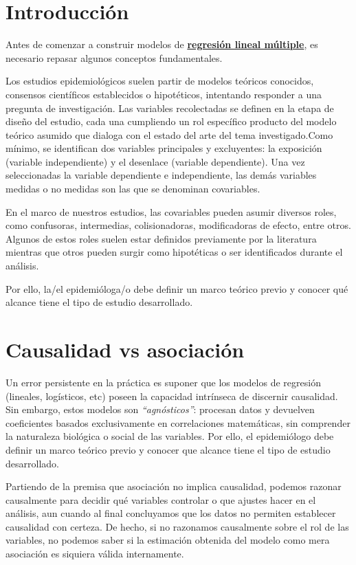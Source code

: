 \documentclass[
  spanish,
  a4paper,
]{scrbook}
\begin{document}
\section{Introducción}\label{introducciuxf3n-15}

Antes de comenzar a construir modelos de
\href{07_reg_lineal_multiple.qmd}{\textbf{regresión lineal múltiple}},
es necesario repasar algunos conceptos fundamentales.

Los estudios epidemiológicos suelen partir de modelos teóricos
conocidos, consensos científicos establecidos o hipotéticos, intentando
responder a una pregunta de investigación. Las variables recolectadas se
definen en la etapa de diseño del estudio, cada una cumpliendo un rol
específico producto del modelo teórico asumido que dialoga con el estado
del arte del tema investigado.Como mínimo, se identifican dos variables
principales y excluyentes: la exposición (variable independiente) y el
desenlace (variable dependiente). Una vez seleccionadas la variable
dependiente e independiente, las demás variables medidas o no medidas
son las que se denominan covariables.

En el marco de nuestros estudios, las covariables pueden asumir diversos
roles, como confusoras, intermedias, colisionadoras, modificadoras de
efecto, entre otros. Algunos de estos roles suelen estar definidos
previamente por la literatura mientras que otros pueden surgir como
hipotéticas o ser identificados durante el análisis.

Por ello, la/el epidemióloga/o debe definir un marco teórico previo y
conocer qué alcance tiene el tipo de estudio desarrollado.

\section{Causalidad vs asociación}\label{causalidad-vs-asociaciuxf3n}

Un error persistente en la práctica es suponer que los modelos de
regresión (lineales, logísticos, etc) poseen la capacidad intrínseca de
discernir causalidad. Sin embargo, estos modelos son
\emph{``agnósticos''}: procesan datos y devuelven coeficientes basados
exclusivamente en correlaciones matemáticas, sin comprender la
naturaleza biológica o social de las variables. Por ello, el
epidemiólogo debe definir un marco teórico previo y conocer que alcance
tiene el tipo de estudio desarrollado.

Partiendo de la premisa que asociación no implica causalidad, podemos
razonar causalmente para decidir qué variables controlar o que ajustes
hacer en el análisis, aun cuando al final concluyamos que los datos no
permiten establecer causalidad con certeza. De hecho, si no razonamos
causalmente sobre el rol de las variables, no podemos saber si la
estimación obtenida del modelo como mera asociación es siquiera válida
internamente.
\end{document}

